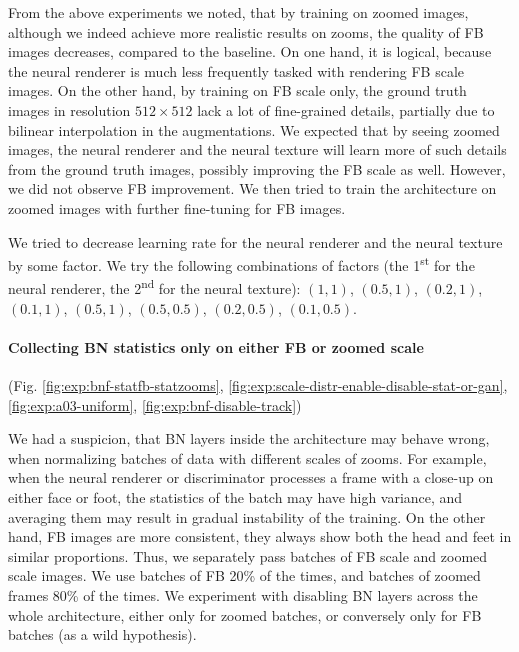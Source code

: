 From the above experiments we noted, that by training on zoomed images, although we indeed achieve more realistic results on zooms, the quality of FB images decreases, compared to the baseline. On one hand, it is logical, because the neural renderer is much less frequently tasked with rendering FB scale images. On the other hand, by training on FB scale only, the ground truth images in resolution $512 \times 512$ lack a lot of fine-grained details, partially due to bilinear interpolation in the augmentations. We expected that by seeing zoomed images, the neural renderer and the neural texture will learn more of such details from the ground truth images, possibly improving the FB scale as well. However, we did not observe FB improvement. We then tried to train the architecture on zoomed images with further fine-tuning for FB images.

We tried to decrease learning rate for the neural renderer and the neural texture by some factor. We try the following combinations of factors (the 1\textsuperscript{st} for the neural renderer, the 2\textsuperscript{nd} for the neural texture): $(1, 1)$, $(0.5, 1)$, $(0.2, 1)$, $(0.1, 1)$, $(0.5, 1)$, $(0.5, 0.5)$, $(0.2, 0.5)$, $(0.1, 0.5)$.

\vspace{-15pt}\paragraph{Collecting BN statistics only on either FB or zoomed scale}(Fig. \ref{fig:exp:bnf-statfb-statzooms}, \ref{fig:exp:scale-distr-enable-disable-stat-or-gan}, \ref{fig:exp:a03-uniform}, \ref{fig:exp:bnf-disable-track})\mbox{}\nopagebreak

We had a suspicion, that BN layers inside the architecture may behave wrong, when normalizing batches of data with different scales of zooms. For example, when the neural renderer or discriminator processes a frame with a close-up on either face or foot, the statistics of the batch may have high variance, and averaging them may result in gradual instability of the training. On the other hand, FB images are more consistent, they always show both the head and feet in similar proportions. Thus, we separately pass batches of FB scale and zoomed scale images. We use batches of FB 20\% of the times, and batches of zoomed frames 80\% of the times. We experiment with disabling BN layers across the whole architecture, either only for zoomed batches, or conversely only for FB batches (as a wild hypothesis). 

